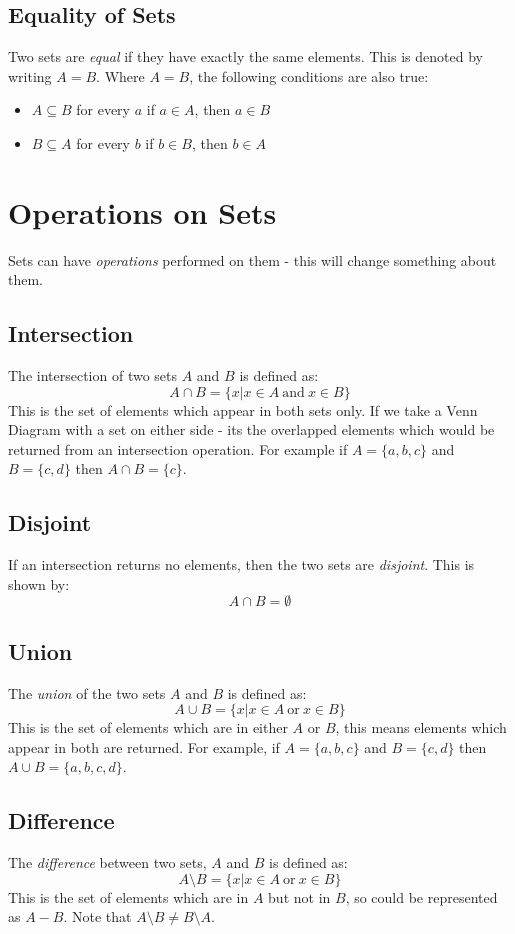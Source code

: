 \subsection{Equality of Sets}
Two sets are \textit{equal} if they have exactly the same elements. This is denoted by writing $A = B$. Where $A = B$, the following conditions are also true:
\begin{itemize}
    \item $A \subseteq B$ for every $a$ if $a \in A$, then $a \in B$
    \item $B \subseteq A$ for every $b$ if $b \in B$, then $b \in A$
\end{itemize}

\section{Operations on Sets}
Sets can have \textit{operations} performed on them - this will change something about them.
\subsection{Intersection}
The intersection of two sets $A$ and $B$ is defined as:
\[A \cap B = \{ x | x \in A \mathrm{\ and\ } x \in B \}\]
This is the set of elements which appear in both sets only. If we take a Venn Diagram with a set on either side -  its the overlapped elements which would be returned from an intersection operation. For example if $A = \{a, b, c\}$ and $B = \{c, d\}$ then $A \cap B = \{c\}$. 

\subsection{Disjoint}
If an intersection returns no elements, then the two sets are \textit{disjoint}. This is shown by:
\[A \cap B = \emptyset\]

\subsection{Union}
The \textit{union} of the two sets $A$ and $B$ is defined as:
\[A \cup B = \{ x | x \in A \mathrm{\ or \ } x \in B \}\]
This is the set of elements which are in either $A$ or $B$, this means elements which appear in both are returned. For example, if $A = \{a, b, c\}$ and $B=\{c, d\}$ then $A \cup B = \{a, b, c, d\}$.

\subsection{Difference}
The \textit{difference} between two sets, $A$ and $B$ is defined as:
\[A \setminus B = \{ x | x \in A \mathrm{\ or \ } x \in B\}\]
This is the set of elements which are in $A$ but not in $B$, so could be represented as $A-B$. Note that $A \setminus B \neq B \setminus A$.

